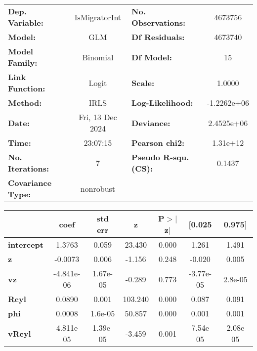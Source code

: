 \begin{center}
\begin{tabular}{lclc}
\toprule
\textbf{Dep. Variable:}   &  IsMigratorInt   & \textbf{  No. Observations:  } &   4673756    \\
\textbf{Model:}           &       GLM        & \textbf{  Df Residuals:      } &   4673740    \\
\textbf{Model Family:}    &     Binomial     & \textbf{  Df Model:          } &        15    \\
\textbf{Link Function:}   &      Logit       & \textbf{  Scale:             } &     1.0000   \\
\textbf{Method:}          &       IRLS       & \textbf{  Log-Likelihood:    } & -1.2262e+06  \\
\textbf{Date:}            & Fri, 13 Dec 2024 & \textbf{  Deviance:          } &  2.4525e+06  \\
\textbf{Time:}            &     23:07:15     & \textbf{  Pearson chi2:      } &   1.31e+12   \\
\textbf{No. Iterations:}  &        7         & \textbf{  Pseudo R-squ. (CS):} &    0.1437    \\
\textbf{Covariance Type:} &    nonrobust     & \textbf{                     } &              \\
\bottomrule
\end{tabular}
\begin{tabular}{lcccccc}
                   & \textbf{coef} & \textbf{std err} & \textbf{z} & \textbf{P$> |$z$|$} & \textbf{[0.025} & \textbf{0.975]}  \\
\midrule
\textbf{intercept} &       1.3763  &        0.059     &    23.430  &         0.000        &        1.261    &        1.491     \\
\textbf{z}         &      -0.0073  &        0.006     &    -1.156  &         0.248        &       -0.020    &        0.005     \\
\textbf{vz}        &   -4.841e-06  &     1.67e-05     &    -0.289  &         0.773        &    -3.77e-05    &      2.8e-05     \\
\textbf{Rcyl}      &       0.0890  &        0.001     &   103.240  &         0.000        &        0.087    &        0.091     \\
\textbf{phi}       &       0.0008  &      1.6e-05     &    50.857  &         0.000        &        0.001    &        0.001     \\
\textbf{vRcyl}     &   -4.811e-05  &     1.39e-05     &    -3.459  &         0.001        &    -7.54e-05    &    -2.08e-05     \\

\end{tabular}
\end{center}

